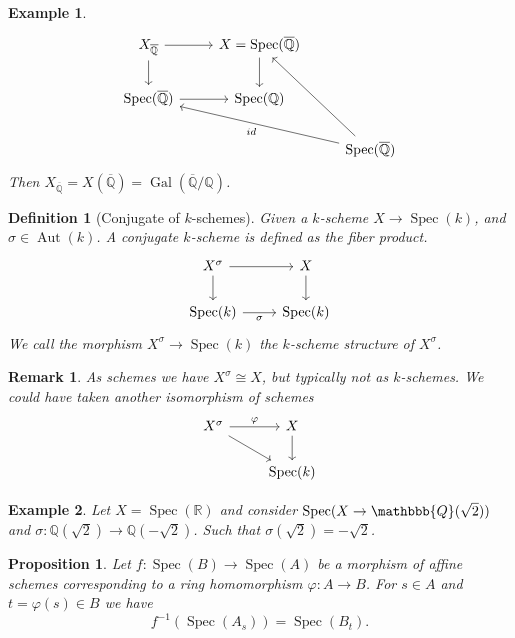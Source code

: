 \documentclass{article}
\newtheorem{proposition}{Proposition}[section]
\newtheorem{definition}{Definition}[section]
\newtheorem{remark}{Remark}[section]
\newtheorem{example}{Example}[section]
\numberwithin{equation}{section}
\DeclareMathOperator{\Gal}{Gal}
\DeclareMathOperator{\Spec}{Spec}
\DeclareMathOperator{\Aut}{Aut}
\begin{document}
\begin{example}
\[
\begin{tikzcd}
X_{\overline{\mathbb{Q}}} \arrow[r] \arrow[d] & X=\Spec(\overline{\mathbb{Q}}) \arrow[d] &                                                            \\
\Spec(\overline{\mathbb{Q}}) \arrow[r]        & \Spec(\mathbb{Q})                        &                                                            \\
                                              &                                          & \Spec(\overline{\mathbb{Q}}) \arrow[luu] \arrow[llu, "id"]
\end{tikzcd}
\]
Then $X_{\overline{\mathbb{Q}}}=X(\overline{\mathbb{Q}})=\Gal(\overline{\mathbb{Q}}/\mathbb{Q})$.
\end{example}

\begin{definition}[Conjugate of $k$-schemes]
Given a $k$-scheme $X\to\Spec(k)$, and $\sigma\in\Aut(k)$. A conjugate $k$-scheme is defined as the fiber product.
\[
\begin{tikzcd}
X^\sigma \arrow[r] \arrow[d]  & X \arrow[d] \\
\Spec(k) \arrow[r, "\sigma"'] & \Spec(k)   
\end{tikzcd}
\]
We call the morphism $X^\sigma\to\Spec(k)$ the $k$-scheme structure of $X^\sigma$.
\end{definition}

\begin{remark}
As schemes we have $X^\sigma\cong X$, but typically not as $k$-schemes. We could have taken another isomorphism of schemes
\[
\begin{tikzcd}
X^\sigma \arrow[rd] \arrow[r, "\varphi"] & X \arrow[d] \\
                                         & \Spec(k)   
\end{tikzcd}
\]
\end{remark}

\begin{example}
Let $X=\Spec(\mathbb{R})$ and consider $\Spec(X\to\mathbbb{Q}(\sqrt{2}))$ and $\sigma:\mathbb{Q}(\sqrt{2})\to\mathbb{Q}(-\sqrt{2})$. Such that $\sigma(\sqrt{2})=-\sqrt{2}$. 
\end{example}

\begin{proposition}
Let $f:\Spec(B)\to\Spec(A)$ be a morphism of affine schemes corresponding to a ring homomorphism $\varphi:A\to B$. For $s\in A$ and $t=\varphi(s)\in B$ we have
\begin{equation*}
f^{-1}(\Spec(A_s)) = \Spec(B_t).
\end{equation*}
\end{proposition}
\end{document}
